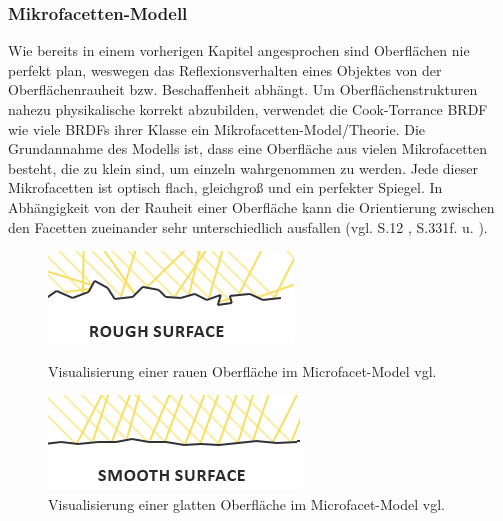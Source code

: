 \documentclass[
  11pt,
  a4paper,
  oneside
  ]{article}
\begin{document}
\subsubsection{Mikrofacetten-Modell }
Wie bereits in einem vorherigen Kapitel angesprochen sind Oberflächen nie perfekt plan, weswegen das Reflexionsverhalten eines Objektes von der Oberflächenrauheit bzw. Beschaffenheit abhängt. Um Oberflächenstrukturen nahezu physikalische korrekt abzubilden, verwendet die Cook-Torrance BRDF wie viele BRDFs ihrer Klasse ein Mikro\-facetten-Model/Theorie. Die Grundannahme des Modells ist, dass eine Oberfläche aus vielen Mikrofacetten besteht, die zu klein sind, um einzeln wahrgenommen zu werden. Jede dieser Mikrofacetten ist optisch flach, gleichgroß und ein perfekter Spiegel. In Abhängigkeit von der Rauheit einer Oberfläche kann die Orientierung zwischen den Facetten zueinander sehr unterschiedlich ausfallen 
(vgl. S.12 \cite{rtrPaper}, S.331f. \cite{realTimeRendering4th} u. \cite{learnOpenGL}).
\begin{figure}[H]
  \centering
  \begin{minipage}{.48\textwidth}
    \centering
    \includegraphics*[width=1\linewidth]{images/microfacets_light_rays1.png}
    \caption{Visualisierung einer rauen Oberfläche im Microfacet-Model vgl. \cite{learnOpenGL}}
    \label{fig:img2_1}
  \end{minipage}%
  \hfill
  \begin{minipage}{.48\textwidth}
    \centering
    \includegraphics*[width=1\linewidth]{images/microfacets_light_rays2.png}
    \caption{Visualisierung einer glatten Oberfläche im Microfacet-Model vgl. \cite{learnOpenGL}}
    \label{fig:img2_2}
  \end{minipage}
\end{figure}
\end{document}
